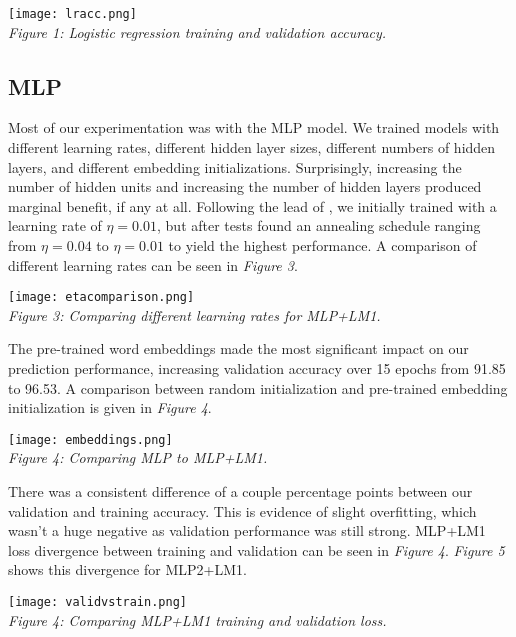 \documentclass[11pt]{article}
\begin{document}
{{\begin{center}
    \texttt{[image: lracc.png]}\\
    \textit{Figure 1: Logistic regression training and validation accuracy.}
\end{center}

\subsection{MLP}

Most of our experimentation was with the MLP model. We trained models with different learning rates, different hidden layer sizes, different numbers of hidden layers, and different embedding initializations. Surprisingly, increasing the number of hidden units and increasing the number of hidden layers produced marginal benefit, if any at all. Following the lead of \cite{collobert2011natural}, we initially trained with a learning rate of $\eta = 0.01$, but after tests found an annealing schedule ranging from $\eta = 0.04$ to $\eta = 0.01$ to yield the highest performance. A comparison of different learning rates can be seen in \textit{Figure 3}.

\begin{center}
    \texttt{[image: etacomparison.png]}\\
    \textit{Figure 3: Comparing different learning rates for MLP+LM1.}
\end{center}

The pre-trained word embeddings made the most significant impact on our prediction performance, increasing validation accuracy over 15 epochs from 91.85 to 96.53. A comparison between random initialization and pre-trained embedding initialization is given in \textit{Figure 4}.

\begin{center}
    \texttt{[image: embeddings.png]}\\
    \textit{Figure 4: Comparing MLP to MLP+LM1.}
\end{center}

There was a consistent difference of a couple percentage points between our validation and training accuracy. This is evidence of slight overfitting, which wasn't a huge negative as validation performance was still strong. MLP+LM1 loss divergence between training and validation can be seen in \textit{Figure 4}. \textit{Figure 5} shows this divergence for MLP2+LM1.

\begin{center}
    \texttt{[image: validvstrain.png]}\\
    \textit{Figure 4: Comparing MLP+LM1 training and validation loss.}
\end{center}

}}
\end{document}
